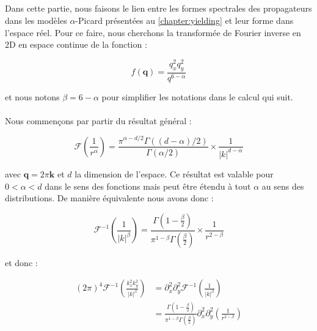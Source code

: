 \label{sec:TFinverse}

\subparagraph{}Dans cette partie, nous faisons le lien entre les formes spectrales des propagateurs dans les modèles $\alpha$-Picard présentées au \autoref{chapter:yielding} et leur forme dans l'espace réel. Pour ce faire, nous cherchons la transformée de Fourier inverse en 2D en espace continue de la fonction :

\begin{equation}
	f(\mathbf{q}) = \frac{q_x^2 q_y^2}{q^{6-\alpha}}
\end{equation}

\noindent et nous notons $\beta = 6 - \alpha$ pour simplifier les notations dans le calcul qui suit.

\paragraph{}Nous commençons par partir du résultat général :

\begin{equation}
    \mathcal{F}\left( \frac{1}{r^\alpha} \right)=\frac{\pi^{\alpha-d / 2} \Gamma((d-\alpha) / 2)}{\Gamma(\alpha / 2)} \times\frac{1}{|k|^{d-\alpha}}
\end{equation}

\noindent avec $\mathbf{q} = 2\pi \mathbf{k}$ et $d$ la dimension de l'espace. Ce résultat est valable pour $0<\alpha<d$ dans le sens des fonctions mais peut être étendu à tout $\alpha$ au sens des distributions. De manière équivalente nous avons donc :

\begin{equation}
    \mathcal{F}^{-1}\left( \frac{1}{\lvert k \rvert^\beta} \right) = \frac{\Gamma\left( 1-\frac{\beta}{2} \right)}{\pi^{1-\beta}\Gamma\left( \frac{\beta}{2} \right)}\times\frac{1}{r^{2-\beta}}
\end{equation}

\noindent et donc :

\begin{equation}
\begin{aligned}
    (2\pi)^4\mathcal{F}^{-1}\left( \frac{k_x^2k_y^2}{\lvert k \rvert^\beta} \right) &= \partial_x^2\partial_y^2\mathcal{F}^{-1}\left( \frac{1}{\lvert k \rvert^\beta} \right)\\
    &=\frac{\Gamma\left( 1-\frac{\beta}{2} \right)}{\pi^{1-\beta}\Gamma\left( \frac{\beta}{2} \right)}\partial_x^2\partial_y^2\left( \frac{1}{r^{2-\beta}} \right)
\end{aligned}
\end{equation}

